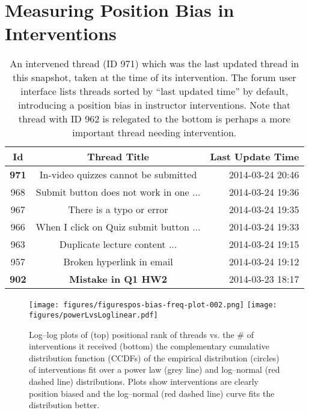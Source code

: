 \documentclass[11pt,a4paper]{article}
\begin{document}

\section{Measuring Position Bias in Interventions}
\label{sect:measure}

\begin{table}
\centering
\scriptsize
\begin{tabular}{|c|c|r|}
\hline
\bf Id & \bf Thread Title & \bf Last Update Time \\
\hline
\bf 971 & In-video quizzes cannot be submitted & 2014-03-24 20:46 \\
\hline
968 & Submit button does not work in one ... & 2014-03-24 19:36 \\
\hline
967 & There is a typo or error & 2014-03-24 19:35\\
\hline
966 & When I click on Quiz submit button ... & 2014-03-24 19:33\\
\hline
963 & Duplicate lecture content ... & 2014-03-24 19:15\\
\hline
957 & Broken hyperlink in email & 2014-03-24 19:12\\
\hline
\bf 902 & \bf Mistake in Q1 HW2 & 2014-03-23 18:17\\
\hline
\end{tabular}
\caption{An intervened thread (ID 971) which was the last updated
  thread in this snapshot, taken at the time of its intervention.  The
  forum user interface lists threads sorted by ``last updated time''
  by default, introducing a position bias in instructor
  interventions. Note that thread with ID 962 is relegated to the 
  bottom is perhaps a more important  thread needing intervention.}
\label{fig:snapshot}
\end{table}

\begin{figure}[h]
\texttt{[image: figures/figurespos-bias-freq-plot-002.png]}
\texttt{[image: figures/powerLvsLoglinear.pdf]}
\caption{Log--log plots of (top) positional rank of threads vs. the \# of  
  interventions it received (bottom) the complementary cumulative distribution 
  function (CCDFs) of the empirical distribution (circles) of interventions 
  fit over a power law (grey line) and log--normal (red dashed line)
  distributions. Plots show interventions are clearly position biased and  
  the log--normal (red dashed line) curve fits the distribution better.}
\label{fig:fit}
\end{figure}
\end{document}

